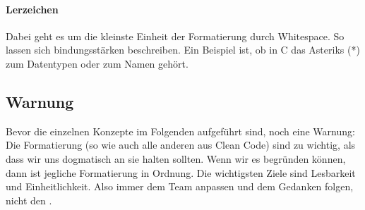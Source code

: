 		\paragraph{Lerzeichen}
			Dabei geht es um die kleinste Einheit der Formatierung durch Whitespace.
			So lassen sich bindungsstärken beschreiben.
			Ein Beispiel ist, ob in C das Asteriks (*) zum Datentypen oder zum Namen gehört.

	\subsection{Warnung}
		Bevor die einzelnen Konzepte im Folgenden aufgeführt sind, noch eine Warnung:\\
		Die Formatierung (so wie auch alle anderen  aus Clean Code) sind zu wichtig, als dass wir uns dogmatisch an sie halten sollten.
		Wenn wir es begründen können, dann ist jegliche Formatierung in Ordnung.
		Die wichtigsten Ziele sind Lesbarkeit und Einheitlichkeit.
		Also immer dem Team anpassen und dem Gedanken folgen, nicht den .

